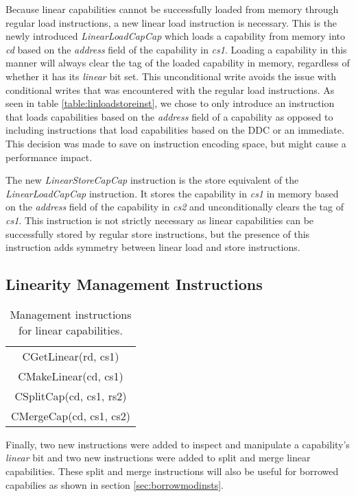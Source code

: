 Because linear capabilities cannot be successfully loaded from memory through regular load instructions, a new linear load instruction is necessary. This is the newly introduced \textit{LinearLoadCapCap} which loads a capability from memory into \textit{cd} based on the \textit{address} field of the capability in \textit{cs1}. Loading a capability in this manner will always clear the tag of the loaded capability in memory, regardless of whether it has its \textit{linear} bit set. This unconditional write avoids the issue with conditional writes that was encountered with the regular load instructions. As seen in table \ref{table:linloadstoreinst}, we chose to only introduce an instruction that loads capabilities based on the \textit{address} field of a capability as opposed to including instructions that load capabilities based on the DDC or an immediate. This decision was made to save on instruction encoding space, but might cause a performance impact.

The new \textit{LinearStoreCapCap} instruction is the store equivalent of the \textit{LinearLoadCapCap} instruction. It stores the capability in \textit{cs1} in memory based on the \textit{address} field of the capability in \textit{cs2} and unconditionally clears the tag of \textit{cs1}. This instruction is not strictly necessary as linear capabilities can be successfully stored by regular store instructions, but the presence of this instruction adds symmetry between linear load and store instructions.

\subsection{Linearity Management Instructions}
\label{sec:lininsts}
\begin{table}[h]
\centering
\begin{tabular}{| c |}
\hline
 CGetLinear(rd, cs1) \\
 CMakeLinear(cd, cs1) \\
 CSplitCap(cd, cs1, rs2) \\
 CMergeCap(cd, cs1, cs2) \\
\hline
\end{tabular}
\caption{Management instructions for linear capabilities.}
\label{table:lininstmanag}
\end{table}

Finally, two new instructions were added to inspect and manipulate a capability's \textit{linear} bit and two new instructions were added to split and merge linear capabilities. These split and merge instructions will also be useful for borrowed capabilies as shown in section \ref{sec:borrowmodinsts}.

